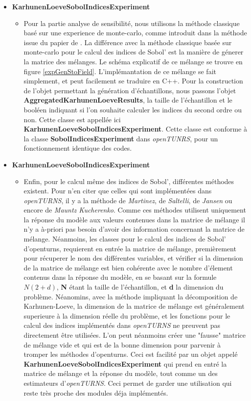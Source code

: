 \documentclass[a4paper,10pt]{article}
\begin{document}
\begin{itemize}
  \item \textbf{KarhunenLoeveSobolIndicesExperiment}
  \begin{itemize}
    \item Pour la partie analyse de sensibilité, nous utilisons la méthode classique basé sur une experience de monte-carlo, comme introduit dans la méthode issue du papier de \cite{Wei2017May}. La différence avec la méthode classique basée sur monte-carlo pour le calcul des indices de Sobol' est la manière de génerer la matrice des mélanges. Le schéma explicatif de ce mélange se trouve en figure \ref{expGenStoField}. L'implémantation de ce mélange se fait simplement, et peut facilement se traduire en C++. Pour la construction de l'objet permettant la génération d'échantillons, nous passons l'objet \textbf{AggregatedKarhunenLoeveResults}, la taille de l'échantillon et le booléen indiquant si l'on souhaite calculer les indices du second ordre ou non. Cette classe est appellée ici \textbf{KarhunenLoeveSobolIndicesExperiment}. Cette classe est conforme à la classe \textbf{SobolIndicesExperiment} dans \textit{openTUNRS}, pour un fonctionnement identique des codes. 
  \end{itemize}
  
  
  \item \textbf{KarhunenLoeveSobolIndicesExperiment}
  \begin{itemize}  
    \item Enfin, pour le calcul même des indices de Sobol', différentes méthodes existent. Pour n'en citer que celles qui sont implémentées dans \textit{openTURNS}, il y a la méthode de \textit{Martinez}, de \textit{Saltelli}, de \textit{Jansen} ou encore de \textit{Mauntz Kucherenko}. Comme ces méthodes utilisent uniquement la réponse du modèle aux valeurs contenues dans la matrice de mélange il n'y a à-priori pas besoin d'avoir des information concernant la matrice de mélange. Néanmoins, les classes pour le calcul des indices de Sobol' d'openturns, requierent en entrée la matrice de mélange, premièrement pour récuperer le nom des différentes variables, et vérifier si la dimension de la matrice de mélange est bien cohérente avec le nombre d'élement contenus dans la réponse du modèle, en se basant sur la formule $ N(2+d) $, \textbf{N} étant la taille de l'échantillon, et \textbf{d} la dimension du problème. Néanomins, avec la méthode impliquant la décomposition de Karhunen-Loeve, la dimension de la matrice de mélange est généralement superieure à la dimension réelle du problème, et les fonctions pour le calcul des indices implémentés dans \textit{openTURNS} ne preuvent pas directement être utilisées. L'on peut néanmoins créer une "fausse" matrice de mélange vide et qui est de la bonne dimension pour parvenir à tromper les méthodes d'openturns. Ceci est facilité par un objet appelé \textbf{KarhunenLoeveSobolIndicesExperiment} qui prend en entré la matrice de mélange et la réponse du modèle, tout comme un des estimateurs d'\textit{openTURNS}. Ceci permet de garder une utilisation qui reste très proche des modules déja implémentés. 
   \end{itemize}
 
\end{itemize}
\end{document}
